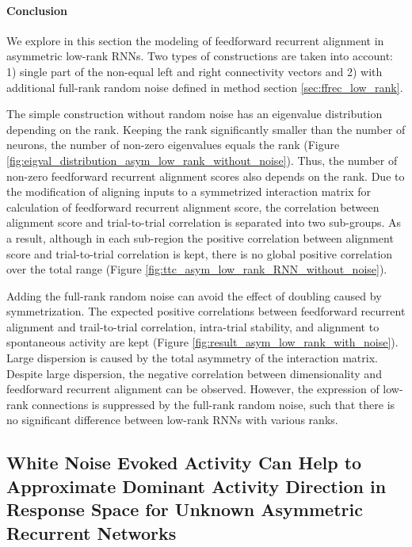 \documentclass[11pt]{article}
\begin{document}
	\vspace{0.7cm}
	\paragraph{Conclusion}
	We explore in this section the modeling of feedforward recurrent alignment in asymmetric low-rank RNNs. Two types of constructions are taken into account: 1) single part of the non-equal left and right connectivity vectors and 2) with additional full-rank random noise defined in method section \ref{sec:ffrec_low_rank}. 
	
	The simple construction without random noise has an eigenvalue distribution depending on the rank. Keeping the rank significantly smaller than the number of neurons, the number of non-zero eigenvalues equals the rank (Figure \ref{fig:eigval_distribution_asym_low_rank_without_noise}). Thus, the number of non-zero feedforward recurrent alignment scores also depends on the rank. Due to the modification of aligning inputs to a symmetrized interaction matrix for calculation of feedforward recurrent alignment score, the correlation between alignment score and trial-to-trial correlation is separated into two sub-groups. As a result, although in each sub-region the positive correlation between alignment score and trial-to-trial correlation is kept, there is no global positive correlation over the total range (Figure \ref{fig:ttc_asym_low_rank_RNN_without_noise}). 
	
	Adding the full-rank random noise can avoid the effect of doubling caused by symmetrization. The expected positive correlations between feedforward recurrent alignment and trail-to-trial correlation, intra-trial stability, and alignment to spontaneous activity are kept (Figure \ref{fig:result_asym_low_rank_with_noise}). Large dispersion is caused by the total asymmetry of the interaction matrix. Despite large dispersion, the negative correlation between dimensionality and feedforward recurrent alignment can be observed. However, the expression of low-rank connections is suppressed by the full-rank random noise, such that there is no significant difference between low-rank RNNs with various ranks. 
	
	\clearpage
	\subsection{White Noise Evoked Activity Can Help to Approximate Dominant Activity Direction in Response Space for Unknown Asymmetric Recurrent Networks}
\end{document}
